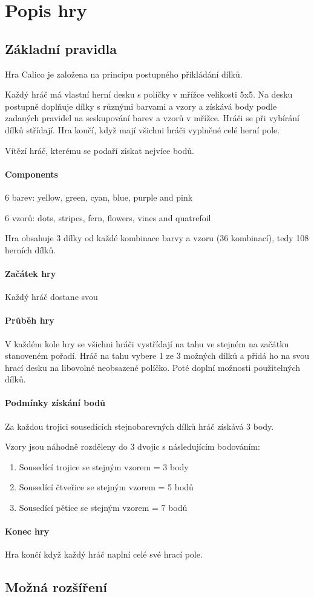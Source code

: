 
\chapter{Popis hry}

\section{Základní pravidla}

Hra Calico je založena na principu postupného přikládání dílků. 

Každý hráč má vlastní herní desku s políčky v mřížce velikosti 5x5. Na desku postupně doplňuje dílky s různými barvami a vzory a získává body podle zadaných pravidel na seskupování barev a vzorů v mřížce. Hráči se při vybírání dílků střídají. Hra končí, když mají všichni hráči vyplněné celé herní pole.

Vítězí hráč, kterému se podaří získat nejvíce bodů.

\subsubsection*{Components}
6 barev: yellow, green, cyan, blue, purple and pink

6 vzorů: dots, stripes, fern, flowers, vines and quatrefoil

Hra obsahuje 3 dílky od každé kombinace barvy a vzoru (36 kombinací), tedy 108 herních dílků.
\subsubsection*{Začátek hry}
Každý hráč dostane svou 
\subsubsection*{Průběh hry}

V každém kole hry se všichni hráči vystřídají na tahu ve stejném na začátku stanoveném pořadí. Hráč na tahu vybere 1 ze 3 možných dílků a přidá ho na svou hrací desku na libovolné neobsazené políčko. Poté doplní možnosti použitelných dílků.

\subsubsection*{Podmínky získání bodů}
Za každou trojici sousedících stejnobarevných dílků hráč získává 3 body.

Vzory jsou náhodně rozděleny do 3 dvojic s následujícím bodováním:
\begin{enumerate}
    \item Sousedící trojice se stejným vzorem = 3 body
    \item Sousedící čtveřice se stejným vzorem = 5 bodů
    \item Sousedící pětice se stejným vzorem = 7 bodů
\end{enumerate}

\subsubsection*{Konec hry}

Hra končí když každý hráč naplní celé své hrací pole.


\section{Možná rozšíření}

